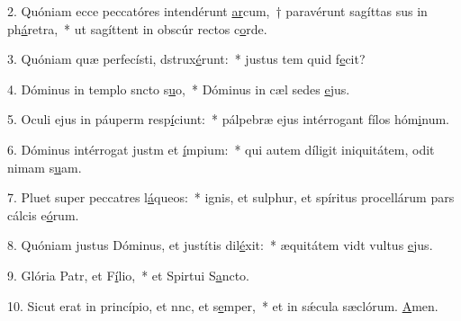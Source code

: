 2. Quóniam ecce peccatóres intendérunt \uline{ar}cum,~† paravérunt sagíttas sus in ph\uline{á}retra,~* ut sagíttent in obscúr rectos c\uline{o}rde.\par 
3. Quóniam quæ perfecísti, dstrux\uline{é}runt:~* justus tem quid f\uline{e}cit?\par 
4. Dóminus in templo sncto s\uline{u}o,~* Dóminus in cæl sedes \uline{e}jus.\par 
5. Oculi ejus in páuperm resp\uline{í}ciunt:~* pálpebræ ejus intérrogant fílos hóm\uline{i}num.\par 
6. Dóminus intérrogat justm et \uline{í}mpium:~* qui autem díligit iniquitátem, odit nimam s\uline{u}am.\par 
7. Pluet super peccatres l\uline{á}queos:~* ignis, et sulphur, et spíritus procellárum pars cálcis e\uline{ó}rum.\par 
8. Quóniam justus Dóminus, et justítis dil\uline{é}xit:~* æquitátem vidt vultus \uline{e}jus.\par 
9. Glória Patr, et F\uline{í}lio,~* et Spirtui S\uline{a}ncto.\par 
10. Sicut erat in princípio, et nnc, et s\uline{e}mper,~* et in sǽcula sæclórum. \uline{A}men.\par 
